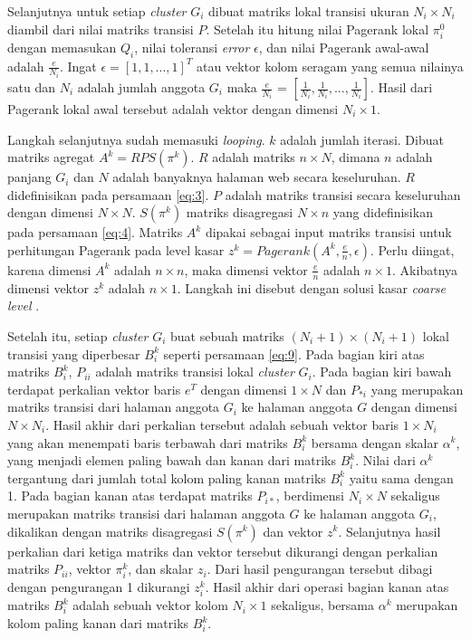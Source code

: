 Selanjutnya untuk setiap \textit{cluster} $G_i$ dibuat matriks lokal transisi ukuran $N_i \times N_i$ diambil dari nilai matriks transisi $P$. Setelah itu hitung nilai Pagerank lokal $\pi^0_i$ dengan memasukan $Q_i$, nilai toleransi \textit{error} $\epsilon$, dan nilai Pagerank awal-awal adalah $\frac{e}{N_i}$. Ingat $\epsilon = [1,1,...,1]^T$ atau vektor kolom seragam yang semua nilainya satu dan $N_i$ adalah jumlah anggota $G_i$ maka $\frac{e}{N_i}$ = $[\frac{1}{N_i}, \frac{1}{N_i},...,\frac{1}{N_i}]$. Hasil dari Pagerank lokal awal tersebut adalah vektor dengan dimensi $N_i \times 1$.

Langkah selanjutnya sudah memasuki \textit{looping}. $k$ adalah jumlah iterasi. Dibuat matriks agregat $A^k = RPS(\pi^k)$. $R$ adalah matriks $n \times N$, dimana $n$ adalah panjang $G_i$ dan $N$ adalah banyaknya halaman web secara keseluruhan. $R$ didefinisikan pada persamaan \ref{eq:3}. $P$ adalah matriks transisi secara keseluruhan dengan dimensi $N \times N$. $S(\pi^k)$ matriks disagregasi $N \times n$ yang didefinisikan pada persamaan \ref{eq:4}. Matriks $A^k$ dipakai sebagai input matriks transisi untuk perhitungan Pagerank pada level kasar $z^k = Pagerank(A^k, \frac{e}{n}, \epsilon)$. Perlu diingat, karena dimensi $A^k$ adalah $n \times n$, maka dimensi vektor $\frac{e}{n}$ adalah $n \times 1$. Akibatnya dimensi vektor $z^k$ adalah $n \times 1$. Langkah ini disebut dengan solusi kasar \textit{coarse level} \citep{zhuetal2005distributedPagerank}.

Setelah itu, setiap \textit{cluster} $G_i$ buat sebuah matriks $(N_i + 1) \times (N_i + 1)$ lokal transisi yang diperbesar $B^k_i$ seperti persamaan \ref{eq:9}. Pada bagian kiri atas matriks $B^k_i$, $P_{ii}$ adalah matriks transisi lokal \textit{cluster} $G_i$. Pada bagian kiri bawah terdapat perkalian vektor baris $e^T$ dengan dimensi $1 \times N$ dan $P_{*i}$ yang merupakan matriks transisi dari halaman anggota $G_i$ ke halaman anggota $G$ dengan dimensi $N \times N_i$. Hasil akhir dari perkalian tersebut adalah sebuah vektor baris $1 \times N_i$ yang akan menempati baris terbawah dari matriks $B^k_i$ bersama dengan skalar $\alpha^k$, yang menjadi elemen paling bawah dan kanan dari matriks $B^k_i$. Nilai dari $\alpha^k$ tergantung dari jumlah total kolom paling kanan matriks $B^k_i$ yaitu sama dengan 1. Pada bagian kanan atas terdapat matriks $P_{i*}$, berdimensi $N_i \times N$ sekaligus merupakan matriks transisi dari halaman anggota $G$ ke halaman anggota $G_i$, dikalikan dengan matriks disagregasi $S(\pi^k)$ dan vektor $z^k$. Selanjutnya hasil perkalian dari ketiga matriks dan vektor tersebut dikurangi dengan perkalian matriks $P_{ii}$, vektor $\pi^k_i$, dan skalar $z_i$. Dari hasil pengurangan tersebut dibagi dengan pengurangan 1 dikurangi $z^k_i$. Hasil akhir dari operasi bagian kanan atas matriks $B^k_i$ adalah sebuah vektor kolom $N_i \times 1$ sekaligus, bersama $\alpha^k$ merupakan kolom paling kanan dari matriks $B^k_i$.

